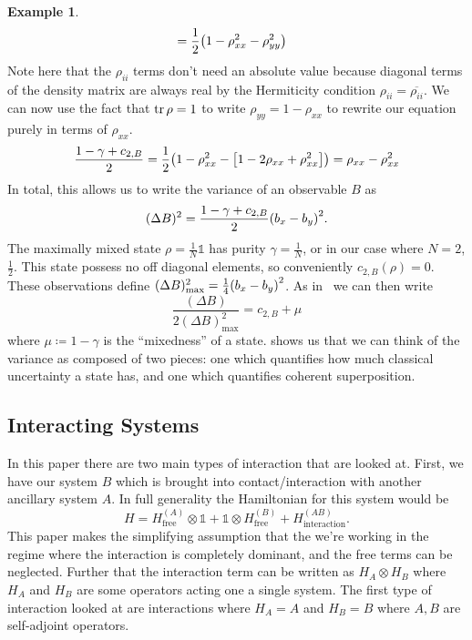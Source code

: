 \documentclass[11pt,english]{article}
\theoremstyle{definition}
\newtheorem{example}{Example}[section]
\newcommand{\twonorm}[1][\rho]{c_{2,B} (#1)}
\newcommand{\twonormE}[1][\rho]{c_{2,B}}
\begin{document}
\begin{example}
\begin{align*}
		                                 & = \frac{1}{2}\qty(1 - \rho_{xx}^2 - \rho_{yy}^2)
	\end{align*}
	Note here that the $\rho_{ii}$ terms don't need an absolute value because diagonal terms of the density matrix are always real by the Hermiticity condition $\rho_{ii} = \overline{\rho_{ii}}$.
	We can now use the fact that $\tr\rho = 1$ to write $\rho_{yy} = 1 - \rho_{xx}$ to rewrite our equation purely in terms of $\rho_{xx}$.
	\begin{equation*}
		\frac{1 - \gamma + \twonormE}{2} =\frac{1}{2}\qty(1 - \rho_{xx}^2 - \qty[1 - 2\rho_{xx} + \rho_{xx}^2]) = \rho_{xx} - \rho_{xx}^2
	\end{equation*}
	In total, this allows us to write the variance of an observable $B$ as
	\begin{equation*}
		(\Delta B)^2 = \frac{1 - \gamma + \twonormE}{2}\qty(b_x - b_y)^2.
	\end{equation*}
	The maximally mixed state $\rho = \frac{1}{N}\mathbb{1}$ has purity $\gamma = \frac{1}{N}$, or in our case where $N = 2$, $\frac{1}{2}$. This state possess no off diagonal elements, so conveniently $\twonorm{} = 0$. These observations define $(\Delta B)_\text{max}^2 = \frac{1}{4}\qty(b_x - b_y)^2$. As in~\cite{dynamic-entropies} we can then write
	\begin{equation}\label{eq:variance-max}
		\frac{(\Delta B)}{2(\Delta B)_\text{max}^2} = \twonormE + \mu
	\end{equation}
	where $\mu\coloneqq 1 - \gamma$ is the ``mixedness'' of a state.  shows us that we can think of the variance as composed of two pieces: one which quantifies how much classical uncertainty a state has, and one which quantifies coherent superposition.
\end{example}

\subsection{Interacting Systems}\label{sec:interacting-systems}
In this paper there are two main types of interaction that are looked at. First, we have our system $B$ which is brought into contact/interaction with another ancillary system $A$. In full generality the Hamiltonian for this system would be
\begin{equation*}
	H = H^{(A)}_\text{free}\otimes\mathbb{1} + \mathbb{1}\otimes H^{(B)}_\text{free} + H^{(AB)}_\text{interaction}.
\end{equation*}
This paper makes the simplifying assumption that the we're working in the regime where the interaction is completely dominant, and the free terms can be neglected. Further that the interaction term can be written as $H_A\otimes H_B$ where $H_A$ and $H_B$ are some operators acting one a single system. The first type of interaction looked at are interactions where $H_A = A$ and $H_B = B$ where $A, B$ are self-adjoint operators.
\end{document}
